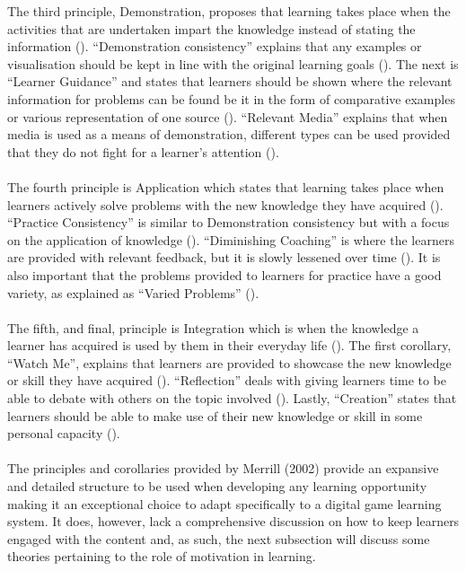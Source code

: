 \noindent The third principle, Demonstration, proposes that learning takes place when the activities that are undertaken impart the knowledge instead of stating the information (\cite{Merrill2002}). “Demonstration consistency” explains that any examples or visualisation should be kept in line with the original learning goals (\cite{Merrill2002}). The next is “Learner Guidance” and states that learners should be shown where the relevant information for problems can be found be it in the form of comparative examples or various representation of one source (\cite{Merrill2002}). “Relevant Media” explains that when media is used as a means of demonstration, different types can be used provided that they do not fight for a learner’s attention (\cite{Merrill2002}).
\\\\
The fourth principle is Application which states that learning takes place when learners actively solve problems with the new knowledge they have acquired (\cite{Merrill2002}). “Practice Consistency” is similar to Demonstration consistency but with a focus on the application of knowledge (\cite{Merrill2002}). “Diminishing Coaching” is where the learners are provided with relevant feedback, but it is slowly lessened over time (\cite{Merrill2002}). It is also important that the problems provided to learners for practice have a good variety, as explained as “Varied Problems” (\cite{Merrill2002}).
\\\\
The fifth, and final, principle is Integration which is when the knowledge a learner has acquired is used by them in their everyday life (\cite{Merrill2002}). The first corollary, “Watch Me”, explains that learners are provided to showcase the new knowledge or skill they have acquired (\cite{Merrill2002}). “Reflection” deals with giving learners time to be able to debate with others on the topic involved (\cite{Merrill2002}). Lastly, “Creation” states that learners should be able to make use of their new knowledge or skill in some personal capacity (\cite{Merrill2002}).
\\\\
The principles and corollaries provided by Merrill (2002) provide an expansive and detailed structure to be used when developing any learning opportunity making it an exceptional choice to adapt specifically to a digital game learning system.  It does, however, lack a comprehensive discussion on how to keep learners engaged with the content and, as such, the next subsection will discuss some theories pertaining to the role of motivation in learning.

